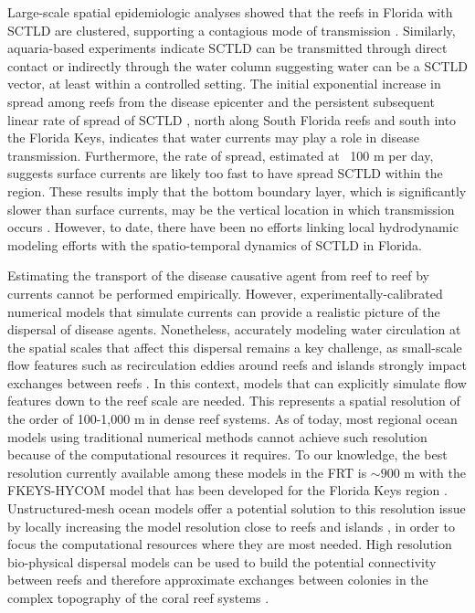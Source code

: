 \documentclass[utf8]{frontiersSCNS}
\begin{document}
Large-scale spatial epidemiologic analyses showed that the reefs in Florida with SCTLD are clustered, supporting a contagious mode of transmission \citep{muller2020spatial}. Similarly, aquaria-based experiments indicate SCTLD can be transmitted through direct contact or indirectly through the water column \citep{aeby2019pathogenesis} suggesting water can be a SCTLD vector, at least within a controlled setting. The initial exponential increase in spread among reefs from the disease epicenter \citep{precht2016unprecedented} and the persistent subsequent linear rate of spread of SCTLD \citep{muller2020spatial}, north along South Florida reefs and south into the Florida Keys, indicates that water currents may play a role in disease transmission. Furthermore, the rate of spread, estimated at ~100 m per day, suggests surface currents are likely too fast to have spread SCTLD within the region. These results imply that the bottom boundary layer, which is significantly slower than surface currents, may be the vertical location in which transmission occurs \citep{aeby2019pathogenesis}. However, to date, there have been no efforts linking local hydrodynamic modeling efforts with the spatio-temporal dynamics of SCTLD in Florida.

Estimating the transport of the disease causative agent from reef to reef by currents cannot be performed empirically. However, experimentally-calibrated numerical models that simulate currents can provide a realistic picture of the dispersal of disease agents. Nonetheless, accurately modeling water circulation at the spatial scales that affect this dispersal remains a key challenge, as small-scale flow features such as recirculation eddies around reefs and islands strongly impact exchanges between reefs \citep{wolanski1994physical, burgess2007influence, figueiredo2013synthesizing}. In this context, models that can explicitly simulate flow features down to the reef scale are needed. This represents a spatial resolution of the order of 100-1,000 m in dense reef systems. As of today, most regional ocean models using traditional numerical methods cannot achieve such resolution because of the computational resources it requires. To our knowledge, the best resolution currently available among these models in the FRT is $\sim900$ m with the FKEYS-HYCOM model that has been developed for the Florida Keys region \citep{kourafalou2012florida, sponaugle2012observed, vaz2016perfect}. Unstructured-mesh ocean models offer a potential solution to this resolution issue by locally increasing the model resolution close to reefs and islands \citep{lambrechts2008multi, thomas2014numerical, thomas2015connectivity}, in order to focus the computational resources where they are most needed. High resolution bio-physical dispersal models can be used to build the potential connectivity between reefs and therefore approximate exchanges between colonies in the complex topography of the coral reef systems \citep{frys20}.
\end{document}

